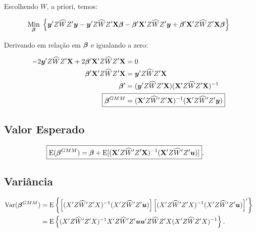 \documentclass[11pt, oneside, a4paper, article]{article}
\numberwithin{equation}{section}
\begin{document}
\begin{description}
	\noindent
	Escolhendo $\widehat{W}$, a priori, temos:

	\vspace{-1 em}
	\begin{align*}
		\underset{\boldsymbol{\beta}}{\text{Min}} \;
		\left\{ 
			\boldsymbol{y}' Z \widehat{W} Z' \boldsymbol{y}
			-
			\boldsymbol{y}' Z \widehat{W} Z' \mathbf{X} \boldsymbol{\beta}
			-
			\boldsymbol{\beta}' \mathbf{X}'  Z \widehat{W} Z' \boldsymbol{y}
			+
			\boldsymbol{\beta}' \mathbf{X}'  Z \widehat{W} Z' \mathbf{X} \boldsymbol{\beta}
		\right\}
	\end{align*}

	Derivando em relação em $\boldsymbol{\beta}$ e igualando a zero:

	\vspace{-1 em}
	\begin{align*}
		-2 \yvec' Z \widehat{W} Z' \Xmat + 2 \betavec'\Xmat' Z \widehat{W} Z' \Xmat &= 0
		\\
		\betavec'\Xmat' Z \widehat{W} Z' \Xmat &= \yvec' Z \widehat{W} Z' \Xmat 
		\\
		\betavec' &= ( \yvec' Z \widehat{W} Z' \Xmat ) ( \Xmat' Z \widehat{W} Z' \Xmat )^{-1}
		\\
		\Aboxed{
		\betavec^{GMM} &= ( \Xmat' Z \widehat{W}' Z' \Xmat )^{-1} ( \Xmat' Z \widehat{W}' Z' \yvec ) }
	\end{align*}

	\subsection{Valor Esperado} 

	\vspace{-1 em}
	\begin{align*}
		\Aboxed{
			\E( \betavec^{GMM} ) &=
			\betavec +
		\E[ ( \Xmat' Z \widehat{W}' Z' \Xmat )^{-1} ( \Xmat' Z \widehat{W}' Z' \uvec ) ] }.
	\end{align*}

	\subsection{Variância} 

	\vspace{-1 em}
	\begin{align*}
		\text{Var}( \boldsymbol{\beta}^{GMM} ) &=
		\text{E} \left\{ 
			\left[ ( X' Z \widehat{W}' Z' X )^{-1} ( X' Z \widehat{W}' Z' \boldsymbol{u} ) \right]
			\left[ ( X' Z \widehat{W}' Z' X )^{-1} ( X' Z \widehat{W}' Z' \boldsymbol{u} ) \right]'
		\right\}
		\\ &=
		\text{E} \left\{ 
			( X' Z \widehat{W}' Z' X )^{-1}
			X' Z \widehat{W}' Z' \boldsymbol{u} \boldsymbol{u}' Z \widehat{W} Z' X 
			( X' Z \widehat{W} Z' X )^{-1}
		\right\}.
	\end{align*}


\end{description}
\end{document}
